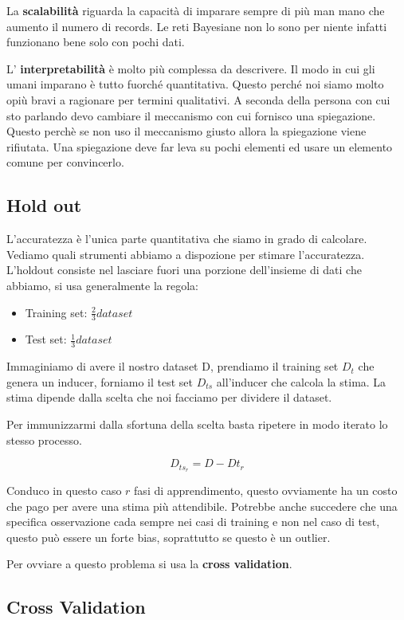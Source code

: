 \documentclass[12pt, a4paper,titlepage,openany]{article}
\begin{document}
La \textbf{scalabilità} riguarda la capacità di imparare sempre di più man mano che aumento il numero di records. Le reti Bayesiane non lo sono per niente infatti funzionano bene solo con pochi dati.

L' \textbf{interpretabilità} è molto più complessa da descrivere. Il modo in cui gli umani imparano è tutto fuorché quantitativa. Questo perché noi siamo molto opiù bravi a ragionare per termini qualitativi. A seconda della persona con cui sto parlando devo cambiare il meccanismo con cui fornisco una spiegazione. Questo perchè se non uso il meccanismo giusto allora la spiegazione viene rifiutata. Una spiegazione deve far leva su pochi elementi ed usare un elemento comune per convincerlo.

\subsection{Hold out}

L'accuratezza è l'unica parte quantitativa che siamo in grado di calcolare.
Vediamo quali strumenti abbiamo a dispozione per stimare l'accuratezza. L'holdout consiste nel lasciare fuori una porzione dell'insieme di dati che abbiamo, si usa generalmente la regola:

\begin{itemize}
	\item Training set: $\frac{2}{3} dataset$
	\item Test set: $\frac{1}{3} dataset$
\end{itemize}

Immaginiamo di avere il nostro dataset D, prendiamo il training set $D_{t}$ che genera un inducer, forniamo il test set $D_{ts}$ all'inducer che calcola la stima. La stima dipende dalla scelta che noi facciamo per dividere il dataset.

Per immunizzarmi dalla sfortuna della scelta basta ripetere in modo iterato lo stesso processo.

\[D_{ts_{r}} = D - D{t_{r}}\]

Conduco in questo caso $r$ fasi di apprendimento, questo ovviamente ha un costo che pago per avere una stima più attendibile.
Potrebbe anche succedere che una specifica osservazione cada sempre nei casi di training e non nel caso di test, questo può essere un forte bias, soprattutto se questo è un outlier.

Per ovviare a questo problema si usa la \textbf{cross validation}. 

\subsection{Cross Validation}
\end{document}
